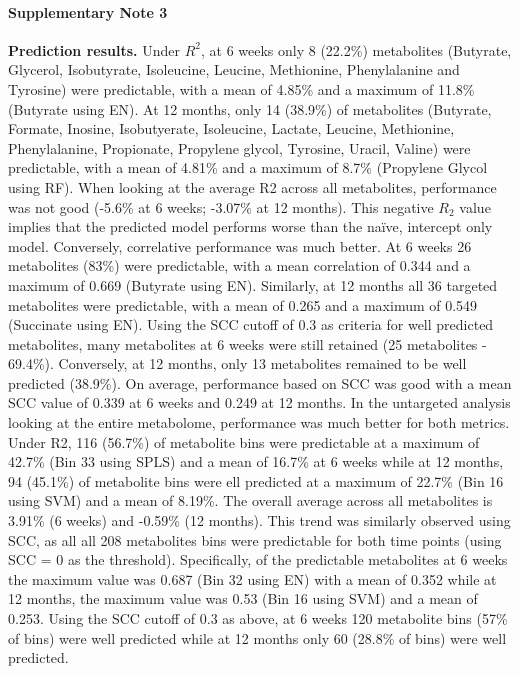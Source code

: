 \paragraph{Supplementary Note 3}
\label{appB_note3}
\textbf{Prediction results.} Under $R^2$, at 6 weeks only 8 (22.2\%) metabolites (Butyrate, Glycerol, Isobutyrate, Isoleucine, Leucine, Methionine, Phenylalanine and Tyrosine) were predictable, with a mean of 4.85\% and a maximum of 11.8\% (Butyrate using EN). At 12 months, only 14 (38.9\%) of metabolites (Butyrate, Formate, Inosine, Isobutyerate, Isoleucine, Lactate, Leucine, Methionine, Phenylalanine, Propionate, Propylene glycol, Tyrosine, Uracil, Valine) were predictable, with a mean of 4.81\% and a maximum of 8.7\% (Propylene Glycol using RF). When looking at the average R2 across all metabolites, performance was not good (-5.6\% at 6 weeks; -3.07\% at 12 months). This negative $R_2$ value implies that the predicted model performs worse than the naïve, intercept only model. Conversely, correlative performance was much better. At 6 weeks 26 metabolites (83\%) were predictable, with a mean correlation of 0.344 and a maximum of 0.669 (Butyrate using EN). Similarly, at 12 months all 36 targeted metabolites were predictable, with a mean of 0.265 and a maximum of 0.549 (Succinate using EN). Using the SCC cutoff of 0.3 as criteria for well predicted metabolites, many metabolites at 6 weeks were still retained (25 metabolites - 69.4\%). Conversely, at 12 months, only 13 metabolites remained to be well predicted (38.9\%). On average, performance based on SCC was good with a mean SCC value of 0.339 at 6 weeks and 0.249 at 12 months. In the untargeted analysis looking at the entire metabolome, performance was much better for both metrics. Under R2, 116 (56.7\%) of metabolite bins were predictable at a maximum of 42.7\% (Bin 33 using SPLS) and a mean of 16.7\% at 6 weeks while at 12 months, 94 (45.1\%) of metabolite bins were ell predicted at a maximum of 22.7\% (Bin 16 using SVM) and a mean of 8.19\%. The overall average across all metabolites is 3.91\% (6 weeks) and -0.59\% (12 months). This trend was similarly observed using SCC, as all all 208 metabolites bins were predictable for both time points (using SCC = 0 as the threshold). Specifically, of the predictable metabolites at 6 weeks the maximum value was 0.687 (Bin 32 using EN) with a mean of 0.352 while at 12 months, the maximum value was 0.53 (Bin 16 using SVM) and a mean of 0.253. Using the SCC cutoff of 0.3 as above, at 6 weeks 120 metabolite bins (57\% of bins) were well predicted while at 12 months only 60 (28.8\% of bins) were well predicted.


